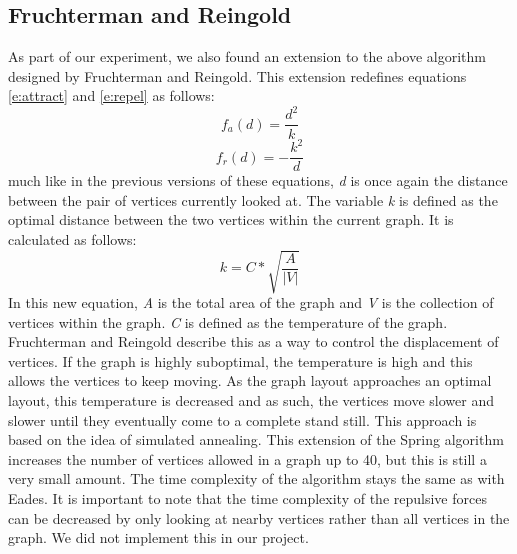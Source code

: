 \documentclass[a4paper,12pt,twoside]{article}
\begin{document}
\subsection{Fruchterman and Reingold}
As part of our experiment, we also found an extension to the above algorithm designed by Fruchterman and Reingold\cite{FandR}. This extension redefines equations \ref{e:attract} and \ref{e:repel} as follows:
\begin{equation}\label{e:FRattract}
f_a(d)=\frac{d^2}{k}
\end{equation}
\begin{equation}\label{e:FRrepel}
f_r(d)=-\frac{k^2}{d}
\end{equation}
much like in the previous versions of these equations, \emph{d} is once again the distance between the pair of vertices currently looked at. The variable \emph{k} is defined as the optimal distance between the two vertices within the current graph. It is calculated as follows:
\begin{equation}\label{e:optimalD}
k=C*\sqrt{\frac{A}{|V|}}
\end{equation}
In this new equation, \emph{A} is the total area of the graph and \emph{V} is the collection of vertices within the graph. \emph{C} is defined as the temperature of the graph. Fruchterman and Reingold describe this as a way to control the displacement of vertices. If the graph is highly suboptimal, the temperature is high and this allows the vertices to keep moving. As the graph layout approaches an optimal layout, this temperature is decreased and as such, the vertices move slower and slower until they eventually come to a complete stand still. This approach is based on the idea of simulated annealing.
\newline
This extension of the Spring algorithm increases the number of vertices allowed in a graph up to 40, but this is still a very small amount. The time complexity of the algorithm stays the same as with Eades. It is important to note that the time complexity of the repulsive forces can be decreased by only looking at nearby vertices rather than all vertices in the graph. We did not implement this in our project.
\end{document}
